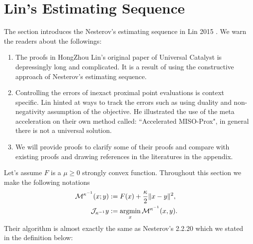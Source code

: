 \documentclass[12pt]{article}
\begin{document}
\section{Lin's Estimating Sequence}\label{sec:lin-2015}
    The section introduces the Nesterov's estimating sequence in Lin 2015 \cite{lin_universal_2015}. 
    We warn the readers about the followings: 
    \begin{enumerate}
        \item The proofs in HongZhou Lin's original paper of Universal Catalyst is depressingly long and complicated. It is a result of using the constructive approach of Nesterov's estimating sequence. 
        \item Controlling the errors of inexact proximal point evaluations is context specific. Lin hinted at ways to track the errors such as using duality and non-negativity assumption of the objective. He illustrated the use of the meta acceleration on their own method called: ``Accelerated MISO-Prox", in general there is not a universal solution. 
        \item We will provide proofs to clarify some of their proofs and compare with existing proofs and drawing references in the literatures in the appendix. 
    \end{enumerate}
    Let's assume $F$ is a $\mu \ge 0$ strongly convex function. 
    Throughout this section we make the following notations
    \begin{align*}
        \mathcal M^{\kappa^{-1}}(x; y) &:= F(x) + \frac{\kappa}{2}\Vert x - y\Vert^2, 
        \\
        \mathcal J_{\kappa^{-1}} y &:= \mathop{\rm argmin}\limits_x \mathcal M^{\kappa^{-1}} (x, y). 
    \end{align*}
    Their algorithm is almost exactly the same as Nesterov's 2.2.20 \cite{nesterov_lectures_2018} which we stated in the definition below: 
\end{document}
